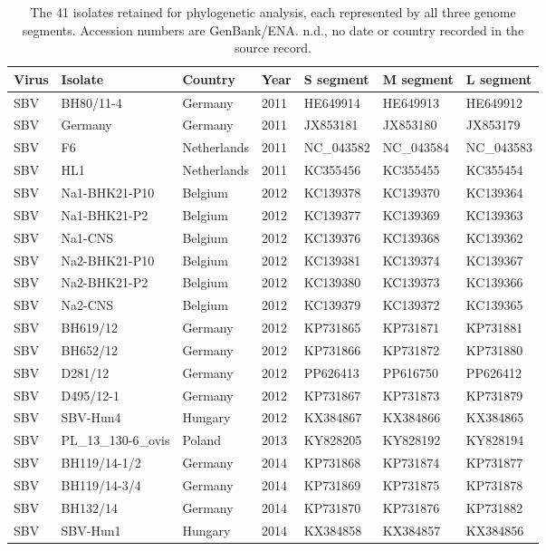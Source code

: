 \begin{table}[htbp]
\centering
\small
\caption{The 41 isolates retained for phylogenetic analysis, each represented
by all three genome segments. Accession numbers are GenBank/ENA.
n.d., no date or country recorded in the source record.}
\label{tab:isolates}
\begin{tabular}{lllllll}
\toprule
Virus & Isolate & Country & Year & S segment & M segment & L segment \\
\midrule
SBV & BH80/11-4 & Germany & 2011 & HE649914 & HE649913 & HE649912 \\
SBV & Germany & Germany & 2011 & JX853181 & JX853180 & JX853179 \\
SBV & F6 & Netherlands & 2011 & NC\_043582 & NC\_043584 & NC\_043583 \\
SBV & HL1 & Netherlands & 2011 & KC355456 & KC355455 & KC355454 \\
SBV & Na1-BHK21-P10 & Belgium & 2012 & KC139378 & KC139370 & KC139364 \\
SBV & Na1-BHK21-P2 & Belgium & 2012 & KC139377 & KC139369 & KC139363 \\
SBV & Na1-CNS & Belgium & 2012 & KC139376 & KC139368 & KC139362 \\
SBV & Na2-BHK21-P10 & Belgium & 2012 & KC139381 & KC139374 & KC139367 \\
SBV & Na2-BHK21-P2 & Belgium & 2012 & KC139380 & KC139373 & KC139366 \\
SBV & Na2-CNS & Belgium & 2012 & KC139379 & KC139372 & KC139365 \\
SBV & BH619/12 & Germany & 2012 & KP731865 & KP731871 & KP731881 \\
SBV & BH652/12 & Germany & 2012 & KP731866 & KP731872 & KP731880 \\
SBV & D281/12 & Germany & 2012 & PP626413 & PP616750 & PP626412 \\
SBV & D495/12-1 & Germany & 2012 & KP731867 & KP731873 & KP731879 \\
SBV & SBV-Hun4 & Hungary & 2012 & KX384867 & KX384866 & KX384865 \\
SBV & PL\_13\_130-6\_ovis & Poland & 2013 & KY828205 & KY828192 & KY828194 \\
SBV & BH119/14-1/2 & Germany & 2014 & KP731868 & KP731874 & KP731877 \\
SBV & BH119/14-3/4 & Germany & 2014 & KP731869 & KP731875 & KP731878 \\
SBV & BH132/14 & Germany & 2014 & KP731870 & KP731876 & KP731882 \\
SBV & SBV-Hun1 & Hungary & 2014 & KX384858 & KX384857 & KX384856 \\

\end{tabular}
\end{table}
